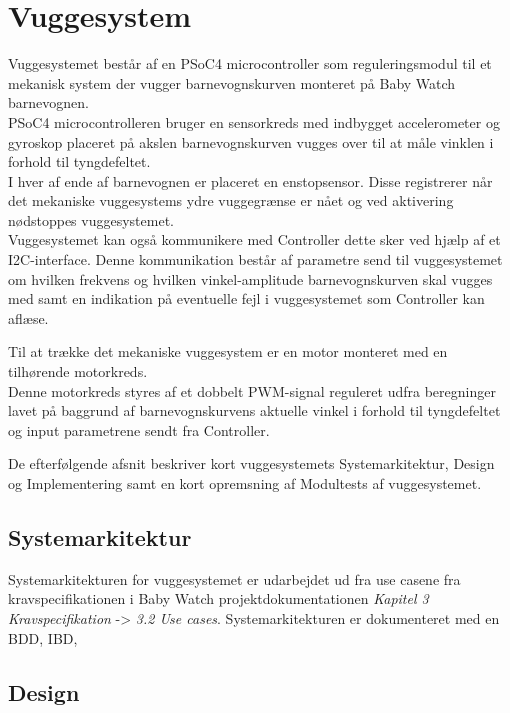 \chapter{Vuggesystem}\label{vuggesys}
Vuggesystemet består af en PSoC4 microcontroller som reguleringsmodul til et mekanisk system der vugger barnevognskurven monteret på Baby Watch barnevognen. \\ PSoC4 microcontrolleren bruger en sensorkreds med indbygget accelerometer og gyroskop placeret på akslen barnevognskurven vugges over til at måle vinklen i forhold til tyngdefeltet. \\ I hver af ende af barnevognen er placeret en enstopsensor. Disse registrerer når det mekaniske vuggesystems ydre vuggegrænse er nået og ved aktivering nødstoppes vuggesystemet. \\ Vuggesystemet kan også kommunikere med Controller dette sker ved hjælp af et I2C-interface. Denne kommunikation består af parametre send til vuggesystemet om hvilken frekvens og hvilken vinkel-amplitude barnevognskurven skal vugges med samt en indikation på eventuelle fejl i vuggesystemet som Controller kan aflæse.

Til at trække det mekaniske vuggesystem er en motor monteret med en tilhørende motorkreds. \\ Denne motorkreds styres af et dobbelt PWM-signal reguleret udfra beregninger lavet på baggrund af barnevognskurvens aktuelle vinkel i forhold til tyngdefeltet og input parametrene sendt fra Controller.

De efterfølgende afsnit beskriver kort vuggesystemets Systemarkitektur, Design  og Implementering samt en kort opremsning af Modultests af vuggesystemet.

\section{Systemarkitektur}
\label{vs_sysark}
Systemarkitekturen for vuggesystemet er udarbejdet ud fra use casene fra kravspecifikationen i Baby Watch projektdokumentationen \textit{Kapitel 3 Kravspecifikation} -> \textit{3.2 Use cases}. Systemarkitekturen er dokumenteret med en BDD, IBD,


\section{Design}
\label{vs_design}

